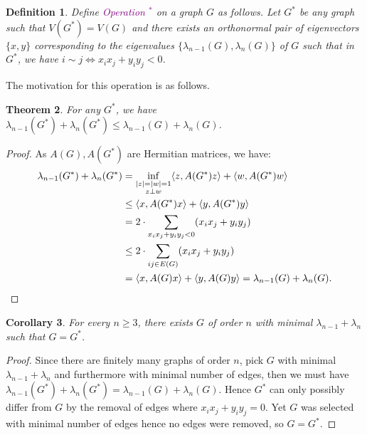 \documentclass[11pt]{article}
\newcommand{\purp}[1]{\textcolor{purple}{#1}}
\newtheorem{thm}{Theorem}[section]
\newtheorem{dfn}[thm]{Definition}
\newtheorem{cor}[thm]{Corollary}
\begin{document}
\begin{dfn}\label{dfn:operation}
    Define \purp{Operation $^*$} on a graph $G$ as follows. Let $G^*$ be any graph such that $V(G^*) = V(G)$ and there exists an orthonormal pair of eigenvectors $\{x, y\}$ corresponding to the eigenvalues $\{\lambda_{n-1}(G), \lambda_n(G)\}$ of $G$ such that in $G^*$, we have $i \sim j \iff x_ix_j + y_iy_j < 0$. 
\end{dfn}

The motivation for this operation is as follows.

\begin{thm}\label{thm:operation-monovar}
    For any $G^*$, we have $\lambda_{n-1}(G^*) + \lambda_n(G^*) \le \lambda_{n-1}(G) + \lambda_n(G)$. 
\end{thm}
\begin{proof}
    As $A(G), A(G^*)$ are Hermitian matrices, we have:
    \begin{align*}
        \lambda_{n-1}(G^*) + \lambda_n(G^*) &= \inf_{\substack{|z| = |w| = 1\\z \perp w}} \langle z, A(G^*)z\rangle + \langle w, A(G^*)w \rangle \\
        &\le \langle x, A(G^*)x\rangle + \langle y, A(G^*)y \rangle \\
        &= 2 \cdot \sum_{x_ix_j + y_iy_j < 0} (x_ix_j + y_iy_j) \\
        &\le 2 \cdot \sum_{ij \in E(G)} (x_ix_j + y_iy_j) \\
        &= \langle x, A(G)x\rangle + \langle y, A(G)y \rangle = \lambda_{n-1}(G) + \lambda_n(G). \qedhere
    \end{align*}
\end{proof}

\begin{cor}\label{cor:worst-invariant}
    For every $n \ge 3$, there exists $G$ of order $n$ with minimal $\lambda_{n-1} + \lambda_n$ such that $G = G^*$. 
\end{cor}
\begin{proof}
    Since there are finitely many graphs of order $n$, pick $G$ with minimal $\lambda_{n-1} + \lambda_n$ and furthermore with minimal number of edges, then we must have $\lambda_{n-1}(G^*) + \lambda_n(G^*) = \lambda_{n-1}(G) + \lambda_n(G)$. Hence $G^*$ can only possibly differ from $G$ by the removal of edges where $x_ix_j + y_iy_j = 0$. Yet $G$ was selected with minimal number of edges hence no edges were removed, so $G = G^*$. 
\end{proof}
\end{document}
